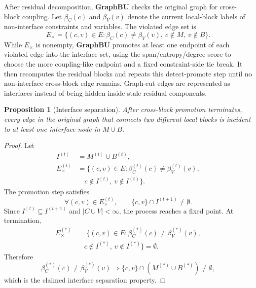 \documentclass[letterpaper]{article}
\newcommand{\method}{\textbf{GraphBU}\xspace}
\newtheorem{proposition}{Proposition}
\begin{document}
After residual decomposition, \method checks the original graph for cross-block coupling. Let $\beta_C(c)$ and $\beta_V(v)$ denote the current local-block labels of non-interface constraints and variables. The violated edge set is
\begin{equation}
E_{\times} =
\{(c,v)\in E:\beta_C(c)\ne \beta_V(v),\ c\notin M,\ v\notin B\}.
\end{equation}
While $E_{\times}$ is nonempty, \method promotes at least one endpoint of each violated edge into the interface set, using the span/entropy/degree score to choose the more coupling-like endpoint and a fixed constraint-side tie break. It then recomputes the residual blocks and repeats this detect-promote step until no non-interface cross-block edge remains. Graph-cut edges are represented as interfaces instead of being hidden inside stale residual components.

\begin{proposition}[Interface separation]
After cross-block promotion terminates, every edge in the original graph that connects two different local blocks is incident to at least one interface node in $M\cup B$.
\end{proposition}

\begin{proof}
Let
\begin{equation}
\begin{aligned}
I^{(t)} &= M^{(t)}\cup B^{(t)},\\
E_{\times}^{(t)}
&= \{(c,v)\in E:
\beta_C^{(t)}(c)\ne\beta_V^{(t)}(v),\\
&\quad c\notin I^{(t)},\ v\notin I^{(t)}\}.
\end{aligned}
\end{equation}
The promotion step satisfies
\begin{equation}
\forall (c,v)\in E_{\times}^{(t)},\qquad
\{c,v\}\cap I^{(t+1)}\ne\emptyset .
\end{equation}
Since $I^{(t)}\subseteq I^{(t+1)}$ and $|C\cup V|<\infty$, the process reaches a fixed point. At termination,
\begin{equation}
\begin{aligned}
E_{\times}^{(*)}
&= \{(c,v)\in E:
\beta_C^{(*)}(c)\ne\beta_V^{(*)}(v),\\
&\quad c\notin I^{(*)},\ v\notin I^{(*)}\}
=\emptyset .
\end{aligned}
\end{equation}
Therefore
\begin{equation}
\beta_C^{(*)}(c)\ne\beta_V^{(*)}(v)
\Longrightarrow
\{c,v\}\cap (M^{(*)}\cup B^{(*)})\ne\emptyset ,
\end{equation}
which is the claimed interface separation property.
\end{proof}
\end{document}
